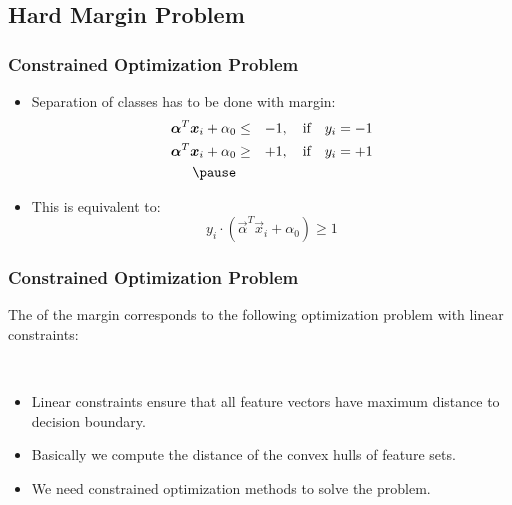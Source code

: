 \subsection{Hard Margin Problem}

\begin{frame}
  \frametitle{Constrained Optimization Problem}
 
  
  \begin{itemize}
    \item Separation of classes has to be done with margin:
      \begin{eqnarray*}
        \vec \alpha^T \vec x_i+\alpha_0 &\leq& -1, \quad \mbox{if} \quad y_i= -1 \\
        \vec \alpha^T \vec x_i+\alpha_0 &\geq& +1, \quad \mbox{if} \quad y_i= +1 \\ \pause
      \end{eqnarray*}
    \item This is equivalent to:
      \begin{displaymath}
        y_i\cdot (\vec \alpha^T\vec x_i + \alpha_0) \geq 1
      \end{displaymath}
  \end{itemize}
\end{frame}


\begin{frame}
  \frametitle{Constrained Optimization Problem \cont}

  The  of the margin corresponds to the following optimization problem with linear constraints:

  \begin{center}
    \\[.2cm]
  \end{center}
  \pause

  
  \begin{itemize}
    \item Linear constraints ensure that all feature vectors have maximum distance to decision boundary. \\[.15cm] \pause
    \item Basically we compute the distance of the convex hulls of feature sets. \\[.15cm] \pause
    \item We need constrained optimization methods to solve the problem.
  \end{itemize}
\end{frame}


